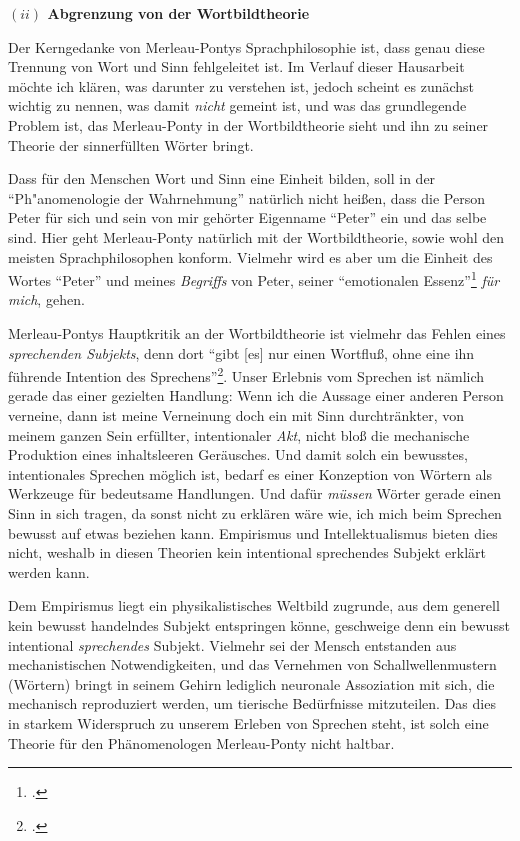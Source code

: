 \documentclass[a4paper, 12pt]{article}
\begin{document}
\begin{onehalfspace}
\vspace{5mm}

\noindent\textbf{$(ii)$ Abgrenzung von der Wortbildtheorie}

\noindent Der Kerngedanke von Merleau-Pontys Sprachphilosophie ist, dass genau diese Trennung von Wort und Sinn fehlgeleitet ist. Im Verlauf dieser Hausarbeit möchte ich klären, was darunter zu verstehen ist, jedoch scheint es zunächst wichtig zu nennen, was damit \emph{nicht} gemeint ist, und was das grundlegende Problem ist, das Merleau-Ponty in der Wortbildtheorie sieht und ihn zu seiner Theorie der sinnerfüllten Wörter bringt.

Dass für den Menschen Wort und Sinn eine Einheit bilden, soll in der "`Ph"anomenologie der Wahrnehmung"' natürlich nicht heißen, dass die Person Peter für sich und sein von mir gehörter Eigenname "`Peter"' ein und das selbe sind. Hier geht Merleau-Ponty natürlich mit der Wortbildtheorie, sowie wohl den meisten Sprachphilosophen konform. Vielmehr wird es aber um die Einheit des Wortes "`Peter"' und meines \emph{Begriffs} von Peter, seiner "`emotionalen Essenz"'\footnote{\Cite[Siehe][S. 222]{merleau1966phanomenologie}.} \emph{für mich}, gehen. 

Merleau-Pontys Hauptkritik an der Wortbildtheorie ist vielmehr das Fehlen eines \emph{sprechenden Subjekts}, denn dort "`gibt [es] nur einen Wortfluß, ohne eine ihn führende Intention des Sprechens"'\footnote{\Cite[Siehe][S. 208]{merleau1966phanomenologie}.}. Unser Erlebnis vom Sprechen ist nämlich gerade das einer gezielten Handlung: Wenn ich die Aussage einer anderen Person verneine, dann ist meine Verneinung doch ein mit Sinn durchtränkter, von meinem ganzen Sein erfüllter, intentionaler \emph{Akt}, nicht bloß die mechanische Produktion eines inhaltsleeren Geräusches. Und damit solch ein bewusstes, intentionales Sprechen möglich ist, bedarf es einer Konzeption von Wörtern als Werkzeuge für bedeutsame Handlungen. Und dafür \emph{müssen} Wörter gerade einen Sinn in sich tragen, da sonst nicht zu erklären wäre wie, ich mich beim Sprechen bewusst auf etwas beziehen kann. Empirismus und Intellektualismus bieten dies nicht, weshalb in diesen Theorien kein intentional sprechendes Subjekt erklärt werden kann.

Dem Empirismus liegt ein physikalistisches Weltbild zugrunde, aus dem generell kein bewusst handelndes Subjekt entspringen könne, geschweige denn ein bewusst intentional \emph{sprechendes} Subjekt. Vielmehr sei der Mensch entstanden aus mechanistischen Notwendigkeiten, und das Vernehmen von Schallwellenmustern (Wörtern) bringt in seinem Gehirn lediglich neuronale Assoziation mit sich, die mechanisch reproduziert werden, um tierische Bedürfnisse mitzuteilen. Das dies in starkem Widerspruch zu unserem Erleben von Sprechen steht, ist solch eine Theorie für den Phänomenologen Merleau-Ponty nicht haltbar.


\end{onehalfspace}
\end{document}

